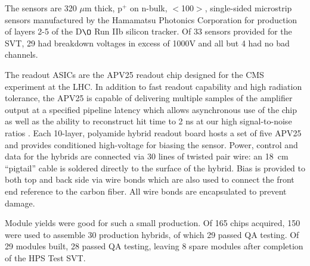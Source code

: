 The sensors are 320 $\mu$m thick, p$^+$ on n-bulk, $<$100$>$, single-sided microstrip sensors manufactured by the Hamamatsu Photonics Corporation for production of layers 2-5 of the D$\O$ Run IIb silicon tracker. Of 33 sensors provided for the SVT, 29 had breakdown voltages in excess of 1000V and all but 4 had no bad channels.  

The readout ASICs are the APV25 readout chip designed for the CMS experiment at the LHC.  In addition to fast readout capability and high radiation tolerance, the APV25 is capable of delivering multiple samples of the amplifier output at a specified pipeline latency which allows asynchronous use of the chip as well as the ability to reconstruct hit time to 2 ns at our high signal-to-noise ratios \cite{HPS_PROP}. Each 10-layer, polyamide hybrid readout board hosts a set of five APV25 and provides conditioned high-voltage for biasing the sensor. Power, control and data for the hybrids are connected via 30 lines of twisted pair wire: an 18~cm ``pigtail'' cable is soldered directly to the surface of the hybrid.  Bias is provided to both top and back side via wire bonds which are also used to connect the front end reference to the carbon fiber. All wire bonds are encapsulated to prevent damage.

Module yields were good for such a small production.  Of 165 chips acquired, 150 were used to assemble 30 production hybrids, of which 29 passed QA testing.  Of 29 modules built, 28 passed QA testing, leaving 8 spare modules after completion of the HPS Test SVT.

